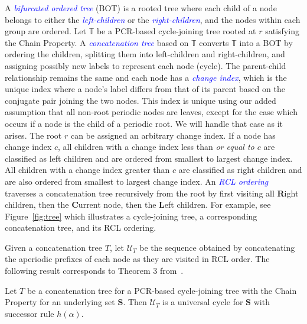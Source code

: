 \documentclass[US-letter,USenglish,authorcolumns,autoref]{lipics-v2021}
\newcommand{\bS}{\mathbf{S}}
\newcommand{\defo}[1] {\emph{\textcolor{blue}{#1}}}
\begin{document}
A \defo{bifurcated ordered tree} (BOT) is a rooted tree where each child of a node belongs to either the \defo{left-children} or the \defo{right-children}, and the nodes within each group are ordered. 
%
Let $\mathbb{T}$ be a PCR-based cycle-joining tree rooted at $r$ satisfying the Chain Property. 
%
A \defo{concatenation tree} %
based on $\mathbb{T}$ converts $\mathbb{T}$ into a BOT
by ordering the children, splitting them into left-children and right-children, and assigning possibly new labels to represent each node (cycle).  The parent-child relationship remains the same and each node has a \defo{change index}, which is the unique index where a node's label differs from that of its parent based on the conjugate pair joining the two nodes.  This index is unique using our added assumption that all non-root periodic nodes are leaves, except for the case which occurs if a node is the child of a periodic root. We will handle that case as it arises.  The root $r$ can be assigned an arbitrary change index.   If a node has change index $c$, all children with a change index less than \emph{or equal to $c$} are classified as left children and are ordered from smallest to largest change index.  All children with a change index greater than $c$ are classified as right children and are also ordered from smallest to largest change index. An \defo{RCL ordering} traverses a concatenation tree recursively from the root by first visiting all {\bf R}ight children, then the {\bf C}urrent node, then the {\bf L}eft children.  For example, see Figure~\ref{fig:tree} which illustrates a cycle-joining tree, a corresponding concatenation tree, and its RCL ordering.  

Given a concatenation tree $T$, let $\mathcal{U}_T$ be the sequence obtained by concatenating the aperiodic prefixes of each node as they are visited in RCL order. The following result corresponds to Theorem 3 from~\cite{concattree}.

\begin{theorem} \label{thm:concat}
Let $T$ be a concatenation tree for a PCR-based cycle-joining tree with the Chain Property for an underlying set $\bS$.  
Then $\mathcal{U}_T$ is a universal cycle for $\bS$ with successor rule $h(\alpha)$.
\end{theorem}



\end{document}
